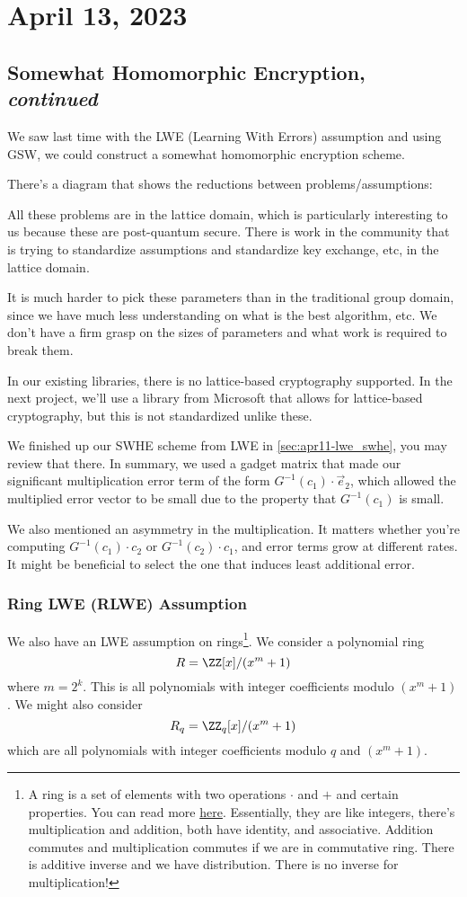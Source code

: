 \section{April 13, 2023}
\label{20230413}
\subsection{Somewhat Homomorphic Encryption, \emph{continued}}
We saw last time with the LWE (Learning With Errors) assumption and using GSW, we could construct a somewhat homomorphic encryption scheme.

There's a diagram that shows the reductions between problems/assumptions:

All these problems are in the lattice domain, which is particularly interesting to us because these are post-quantum secure. There is work in the community that is trying to standardize assumptions and standardize key exchange, etc, in the lattice domain.

It is much harder to pick these parameters than in the traditional group domain, since we have much less understanding on what is the best algorithm, etc. We don't have a firm grasp on the sizes of parameters and what work is required to break them.

In our existing libraries, there is no lattice-based cryptography supported. In the next project, we'll use a library from Microsoft that allows for lattice-based cryptography, but this is not standardized unlike these.

We finished up our SWHE scheme from LWE in \cref{sec:apr11-lwe_swhe}, you may review that there. In summary, we used a gadget matrix that made our significant multiplication error term of the form $G^{-1}(c_1)\cdot \vec{e}_2$, which allowed the multiplied error vector to be small due to the property that $G^{-1}(c_1)$ is small.

We also mentioned an asymmetry in the multiplication. It matters whether you're computing $G^{-1}(c_1)\cdot c_2$ or $G^{-1}(c_2)\cdot c_1$, and error terms grow at different rates. It might be beneficial to select the one that induces least additional error.

\subsubsection{Ring LWE (RLWE) Assumption}
We also have an LWE assumption on rings\footnote{A ring is a set of elements with two operations $\cdot$ and $+$ and certain properties. You can read more \href{https://en.wikipedia.org/wiki/Ring_(mathematics)}{here}. Essentially, they are like integers, there's multiplication and addition, both have identity, and associative. Addition commutes and multiplication commutes if we are in commutative ring. There is additive inverse and we have distribution. There is no inverse for multiplication!}. We consider a polynomial ring
\[R = \ZZ[x]/(x^m + 1)\]
where $m = 2^k$. This is all polynomials with integer coefficients modulo $(x^m + 1)$. We might also consider
\[R_q = \ZZ_q[x] / (x^m + 1)\]
which are all polynomials with integer coefficients modulo $q$ and $(x^m + 1)$.

